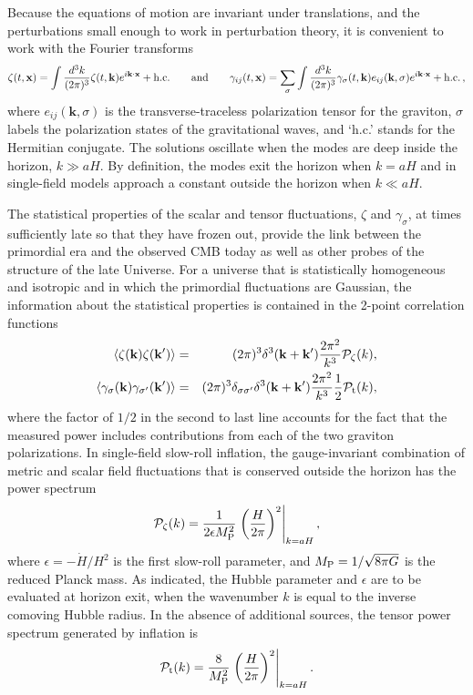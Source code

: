 Because the equations of motion are invariant under translations, and the perturbations small enough to work in perturbation theory, it is convenient to work with the Fourier transforms
\begin{equation}
\zeta(t,\mathbf{x})=\int \frac{d^3 k}{(2\pi)^3}\zeta(t,\mathbf{k})e^{i \mathbf{k}\cdot\mathbf{x}}+{\rm h.c.}\qquad{\rm and}\qquad\gamma_{ij}(t,\mathbf{x})=\sum\limits_\sigma\int\frac{d^3k}{(2\pi)^3}\gamma_\sigma(t,\mathbf{k})e_{ij}(\mathbf{k},\sigma)e^{i \mathbf{k}\cdot\mathbf{x}}+{\rm h.c.}\,,
\end{equation}
where $e_{ij}(\mathbf{k},\sigma)$ is the transverse-traceless polarization tensor for the graviton, $\sigma$ labels the polarization states of the gravitational waves,
and `h.c.' stands for the Hermitian conjugate. The solutions oscillate when the modes are deep inside the horizon, $k\gg aH$. By definition, the modes exit the horizon when $k=aH$ and in single-field models approach a constant outside the horizon when $k\ll aH$.

The statistical properties of the scalar and tensor fluctuations, $\zeta$ and $\gamma_\sigma$, at times sufficiently late so that they have frozen out, provide the link between the primordial era and the observed CMB today as well as other probes of the structure of the late Universe. For a universe that is statistically homogeneous and isotropic and in which the primordial fluctuations are Gaussian, the information about the statistical properties is contained in the 2-point correlation functions
\begin{eqnarray}
\langle\zeta(\mathbf{k})\zeta(\mathbf{k}^{\prime})\rangle&=&(2\pi)^3\delta^3(\mathbf{k}+\mathbf{k}^{\prime})\frac{2\pi^2}{k^3}\mathcal{P}_{\zeta}(k),\nonumber\\
\langle\gamma_\sigma(\mathbf{k})\gamma_{\sigma^{\prime}}(\mathbf{k}^{\prime})\rangle&=&(2\pi)^3\delta_{\sigma\sigma^{\prime}}\delta^3(\mathbf{k}+\mathbf{k}^{\prime})\frac{2\pi^2}{k^3}\frac{1}{2}\mathcal{P}_{\rm t}(k),\nonumber\\
\end{eqnarray}
where the factor of $1/2$ in the second to last line accounts for the fact that the measured power includes contributions from each of the two graviton polarizations. In single-field slow-roll inflation, the gauge-invariant combination of metric and scalar field fluctuations that is conserved outside the horizon has the power spectrum
\begin{equation}
\label{eq:inf_Pzeta}
\mathcal{P}_{\zeta}(k)=\frac{1}{2\epsilon M_{\rm P}^2}\left.\left(\frac{H}{2\pi}\right)^2\right|_{k=aH},
\end{equation}
where $\epsilon=-\dot{H}/H^2$ is the first slow-roll parameter, and $M_{\rm P}=1/\sqrt{8\pi G}$ is the reduced Planck mass. As indicated, the Hubble parameter and $\epsilon$ are to be evaluated at horizon exit, when the wavenumber $k$ is equal to the inverse comoving Hubble radius. In the absence of additional sources, the tensor power spectrum generated by inflation is
\begin{equation}
\label{eq:inf_Pt}
\mathcal{P}_{\rm t}(k)=\frac{8}{M_{\rm P}^2}\left.\left(\frac{H}{2\pi}\right)^2\right|_{k=aH}.
\end{equation}

